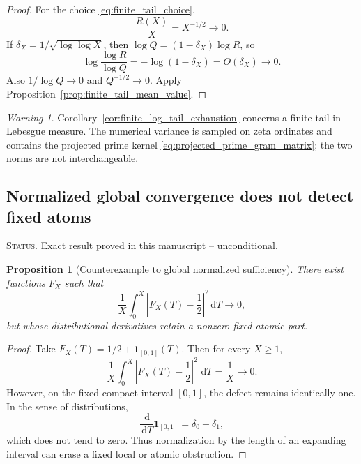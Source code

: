 \documentclass[11pt]{amsart}
\numberwithin{equation}{section}
\theoremstyle{plain}
\newtheorem{proposition}[theorem]{Proposition}
\theoremstyle{definition}
\theoremstyle{remark}
\newtheorem{warning}[theorem]{Warning}
\newcommand{\1}{\mathbf{1}}
\newcommand{\dd}{\,\mathrm{d}}
\newcommand{\statusnote}[1]{%
  \par\smallskip\noindent
  \begingroup\footnotesize\textsc{Status.} #1\endgroup
  \par\smallskip}
\begin{document}
\begin{proof}
For the choice \eqref{eq:finite_tail_choice},
\begin{equation}
\frac{R(X)}{X}=X^{-1/2}\longrightarrow0.
\label{eq:finite_tail_RX}
\end{equation}
If \(\delta_X=1/\sqrt{\log\log X}\), then
\(\log Q=(1-\delta_X)\log R\), so
\begin{equation}
\log\frac{\log R}{\log Q}
=
-\log(1-\delta_X)
=
O(\delta_X)\longrightarrow0.
\label{eq:finite_tail_log_ratio}
\end{equation}
Also \(1/\log Q\to0\) and \(Q^{-1/2}\to0\).  Apply
Proposition~\ref{prop:finite_tail_mean_value}.
\end{proof}

\begin{warning}
\label{warn:finite_tail_not_full_residual}
Corollary~\ref{cor:finite_log_tail_exhaustion} concerns a finite tail in
Lebesgue measure.  The numerical variance is sampled on zeta ordinates and
contains the projected prime kernel \eqref{eq:projected_prime_gram_matrix}; the two norms are
not interchangeable.
\end{warning}

\subsection{Normalized global convergence does not detect fixed atoms}
\label{subsec:global_not_local}

\statusnote{Exact result proved in this manuscript -- unconditional.}
\begin{proposition}[Counterexample to global normalized sufficiency]
\label{prop:global_normalized_counterexample}
There exist functions $F_X$ such that
\begin{equation}
\frac1X\int_0^X
\left|F_X(T)-\frac12\right|^2\dd T
\longrightarrow0,
\label{eq:global_normalized_convergence}
\end{equation}
but whose distributional derivatives retain a nonzero fixed atomic part.
\end{proposition}

\begin{proof}
Take \(F_X(T)=1/2+\1_{[0,1]}(T)\).  Then for every \(X\geq1\),
\begin{equation}
\frac1X\int_0^X\left|F_X(T)-\frac12\right|^2\,\dd T
=
\frac1X\longrightarrow0.
\label{eq:global_counterexample_mean}
\end{equation}
However, on the fixed compact interval \([0,1]\), the defect remains
identically one.  In the sense of distributions,
\begin{equation}
\frac{\dd}{\dd T}\1_{[0,1]}
=
\delta_0-\delta_1,
\label{eq:global_counterexample_derivative}
\end{equation}
which does not tend to zero.  Thus normalization by the length of an
expanding interval can erase a fixed local or atomic obstruction.
\end{proof}
\end{document}

